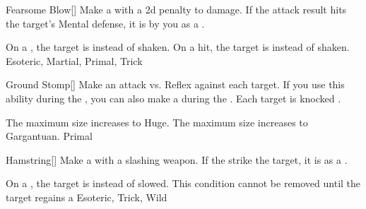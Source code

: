 \lowercase{\hypertarget{maneuver:Fearsome Blow}{}}\label{maneuver:Fearsome Blow}
\hypertarget{maneuver:Fearsome Blow}{}
\begin{freeability}[Rank 3]{Fearsome Blow}[]
Make a  with a \minus2d penalty to damage.
If the attack result hits the target's Mental defense,
it is  by you as a .

\rankline
{} On a , the target is  instead of shaken.
 On a hit, the target is  instead of shaken.
 Esoteric, Martial, Primal, Trick
\end{freeability}
\vspace{0.25em}



\lowercase{\hypertarget{maneuver:Ground Stomp}{}}\label{maneuver:Ground Stomp}
\hypertarget{maneuver:Ground Stomp}{}
\begin{freeability}[Rank 3]{Ground Stomp}[]
Make an attack vs. Reflex against each target.
If you use this ability during the , you can also make a  during the .
\hit Each target is knocked \prone.

\rankline
{} The maximum size increases to Huge.
 The maximum size increases to Gargantuan.
 Primal
\end{freeability}
\vspace{0.25em}



\lowercase{\hypertarget{maneuver:Hamstring}{}}\label{maneuver:Hamstring}
\hypertarget{maneuver:Hamstring}{}
\begin{freeability}[Rank 3]{Hamstring}[]
Make a  with a slashing weapon.
If the strike  the target, it is  as a .

\rankline
{} On a , the target is  instead of slowed.
 This condition cannot be removed until the target regains a 
 Esoteric, Trick, Wild
\end{freeability}
\vspace{0.25em}



